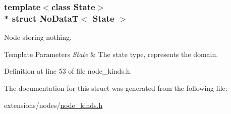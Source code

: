 \subsubsection*{template$<$class State$>$\\*
struct No\+Data\+T$<$ State $>$}

Node storing nothing. 


\begin{DoxyTemplParams}{Template Parameters}
{\em State} & The state type, represents the domain. \\
\hline
\end{DoxyTemplParams}


Definition at line 53 of file node\+\_\+kinds.\+h.



The documentation for this struct was generated from the following file\+:\begin{DoxyCompactItemize}
\item 
extensions/nodes/\hyperlink{node__kinds_8h}{node\+\_\+kinds.\+h}\end{DoxyCompactItemize}

